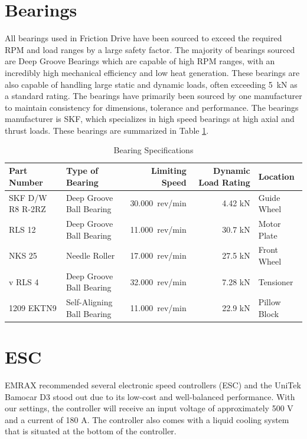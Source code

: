 \documentclass[main.tex]{subfiles}
\begin{document}
\section{Bearings}
All bearings used in Friction Drive have been sourced to exceed the required RPM and load ranges by a large safety factor. The majority of bearings sourced are Deep Groove Bearings which are capable of high RPM ranges, with an incredibly high mechanical efficiency and low heat generation. These bearings are also capable of handling large static and dynamic loads, often exceeding \SI{5}{kN} as a standard rating. The bearings have primarily been sourced by one manufacturer to maintain consistency for dimensions, tolerance and performance. The bearings manufacturer is SKF, which specializes in high speed bearings at high axial and thrust loads. These bearings are summarized in Table \ref{table:bearingtable}.\\

\begin{table}
\centering
  \begin{tabular}{@{}l l r r l@{}} \toprule
    Part Number & Type of Bearing & Limiting Speed & Dynamic Load Rating & Location \\ \midrule
    SKF D/W R8 R-2RZ & Deep Groove Ball Bearing & \SI{30,000}{rev/min} & 4.42 kN & Guide Wheel\\
    RLS 12 & Deep Groove Ball Bearing& \SI{11,000}{rev/min} & 30.7 kN & Motor Plate\\
    NKS 25 & Needle Roller & \SI{17,000}{rev/min} & 27.5 kN & Front Wheel\\
v    RLS 4 & Deep Groove Ball Bearing & \SI{32,000}{rev/min} & 7.28 kN & Tensioner \\
    1209 EKTN9 & Self-Aligning Ball Bearing & \SI{11,000}{rev/min} & 22.9 kN & Pillow Block \\  \bottomrule
  \end{tabular}
  \caption{Bearing Specifications}
  \label{table:bearingtable}
\end{table}

    \section{ESC}
    EMRAX recommended several electronic speed controllers (ESC) and the UniTek Bamocar D3 stood out due to its low-cost and well-balanced performance. With our settings, the controller will receive an input voltage of approximately 500 V and a current of 180 A. The controller also comes with a liquid cooling system that is situated at the bottom of the controller.\\
\end{document}
